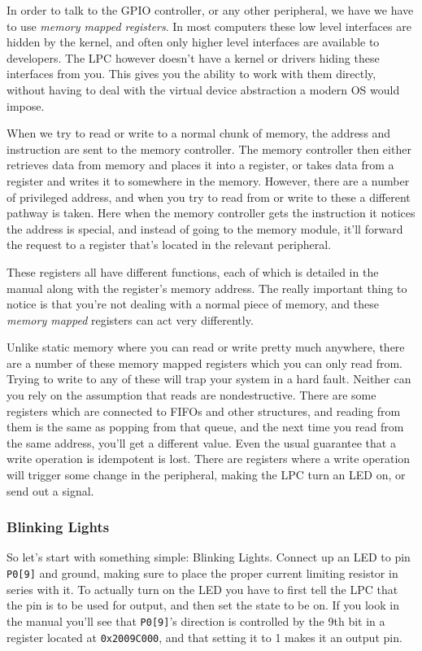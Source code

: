 \documentclass[]{article}
\begin{document}
In order to talk to the GPIO controller, or any other peripheral, we
have we have to use \emph{memory mapped registers}. In most computers
these low level interfaces are hidden by the kernel, and often only
higher level interfaces are available to developers. The LPC however
doesn't have a kernel or drivers hiding these interfaces from you. This
gives you the ability to work with them directly, without having to deal
with the virtual device abstraction a modern OS would impose.

When we try to read or write to a normal chunk of memory, the address
and instruction are sent to the memory controller. The memory controller
then either retrieves data from memory and places it into a register, or
takes data from a register and writes it to somewhere in the memory.
However, there are a number of privileged address, and when you try to
read from or write to these a different pathway is taken. Here when the
memory controller gets the instruction it notices the address is
special, and instead of going to the memory module, it'll forward the
request to a register that's located in the relevant peripheral.

These registers all have different functions, each of which is detailed
in the manual along with the register's memory address. The really
important thing to notice is that you're not dealing with a normal piece
of memory, and these \emph{memory mapped} registers can act very
differently.

Unlike static memory where you can read or write pretty much anywhere,
there are a number of these memory mapped registers which you can only
read from. Trying to write to any of these will trap your system in a
hard fault. Neither can you rely on the assumption that reads are
nondestructive. There are some registers which are connected to FIFOs
and other structures, and reading from them is the same as popping from
that queue, and the next time you read from the same address, you'll get
a different value. Even the usual guarantee that a write operation is
idempotent is lost. There are registers where a write operation will
trigger some change in the peripheral, making the LPC turn an LED on, or
send out a signal.

\subsubsection{Blinking Lights}

So let's start with something simple: Blinking Lights. Connect up an LED
to pin \texttt{P0{[}9{]}} and ground, making sure to place the proper
current limiting resistor in series with it. To actually turn on the LED
you have to first tell the LPC that the pin is to be used for output,
and then set the state to be on. If you look in the manual you'll see
that \texttt{P0{[}9{]}}'s direction is controlled by the 9th bit in a
register located at \texttt{0x2009C000}, and that setting it to 1 makes
it an output pin. 
\end{document}
